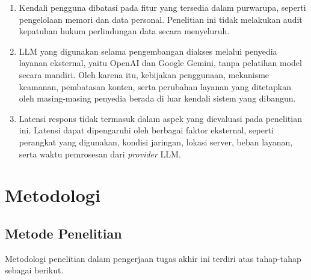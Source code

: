 \begin{enumerate}[label=\arabic*.,leftmargin=*,itemsep=4pt]
  \item Kendali pengguna dibatasi pada fitur yang tersedia dalam purwarupa, seperti pengelolaan memori dan data personal. Penelitian ini tidak melakukan audit kepatuhan hukum perlindungan data secara menyeluruh.
  \item LLM yang digunakan selama pengembangan diakses melalui penyedia layanan eksternal, yaitu OpenAI dan Google Gemini, tanpa pelatihan model secara mandiri. Oleh karena itu, kebijakan penggunaan, mekanisme keamanan, pembatasan konten, serta perubahan layanan yang ditetapkan oleh masing-masing penyedia berada di luar kendali sistem yang dibangun.

  \item Latensi respons tidak termasuk dalam aspek yang dievaluasi pada penelitian ini. Latensi dapat dipengaruhi oleh berbagai faktor eksternal, seperti perangkat yang digunakan, kondisi jaringan, lokasi server, beban layanan, serta waktu pemrosesan dari \textit{provider} LLM.
\end{enumerate}

\section{Metodologi}
\label{sec:metodologi}

\subsection{Metode Penelitian}
\label{subsec:metode-penelitian}

Metodologi penelitian dalam pengerjaan tugas akhir ini terdiri atas tahap-tahap sebagai berikut.

